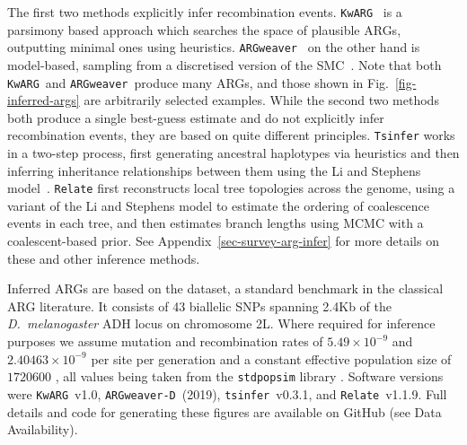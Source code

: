 \documentclass{article}
\newcommand{\tsinfer}[0]{\texttt{tsinfer}}
\newcommand{\kwarg}[0]{\texttt{KwARG}}
\newcommand{\argweaver}[0]{\texttt{ARGweaver}}
\newcommand{\argweaverD}[0]{\texttt{ARGweaver-D}}
\newcommand{\relate}[0]{\texttt{Relate}}
\begin{document}
The first two methods explicitly infer recombination events.
\kwarg~\citep{ignatieva2021kwarg} is a parsimony based approach
which searches the space of plausible ARGs,
outputting minimal ones using heuristics.
\argweaver~\citep{rasmussen2014genome} on the other hand is
model-based, sampling from a discretised version of the
SMC~\citep{mcvean2005approximating,marjoram2006fast}.
Note that both \kwarg\ and \argweaver\ produce many ARGs,
and those shown in Fig.~\ref{fig-inferred-args} are arbitrarily selected
examples.
While the second two methods
both produce a single best-guess estimate and
do not explicitly infer recombination events, they are based on
quite different principles.
\texttt{Tsinfer} works in a two-step process, first generating ancestral
haplotypes via heuristics and then inferring inheritance relationships
between them using the Li and Stephens model~\citep{li2003modeling}.
\texttt{Relate} first reconstructs local tree topologies across the genome,
using a variant of the Li and Stephens model to estimate the
ordering of coalescence events in each tree, and then estimates
branch lengths using MCMC with a coalescent-based prior.
See Appendix~\ref{sec-survey-arg-infer} for more details on these
and other inference methods.

Inferred ARGs are based on the \citet{kreitman1983nucleotide} dataset,
a standard benchmark in the classical ARG
literature.
It consists of 43 biallelic SNPs spanning 2.4Kb of the \emph{D.~melanogaster} ADH
locus on chromosome 2L. Where required for inference purposes we assume
mutation and recombination rates of $5.49\times10^{-9}$
and $2.40463\times10^{-9}$ per site per generation
\citep{schrider2013rates,comeron2012many}
and a constant effective population size of $1720600$ \citep{li2006inferring}, all
values being taken from the \texttt{stdpopsim} library
\citep{adrion2020community,lauterbur2023expanding}.
Software versions were \kwarg~v1.0, \argweaverD~(2019),
\tsinfer~v0.3.1, and \relate~v1.1.9.
Full details and code for generating
these figures are available on GitHub (see Data Availability).
\end{document}
